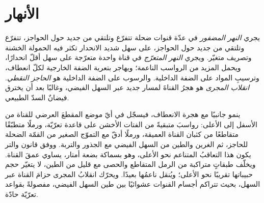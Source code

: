 \section{الأنهار}\label{sec:b3:facies-models:rivers}

\begin{definition}\label{def:b3:facies-models:rivers}
يجري \emph{النهر المضفور} في عدّة قنوات ضحلة تتفرّع وتلتقي من جديد حول الحواجز،
تتفرّع وتلتقي من جديد حول الحواجز، على سهل شديد الانحدار تكثر فيه الحمولة الخشنة
وتصريف متغيّر. ويجري \emph{النهر المتعرّج}
في قناة واحدة متعرّجة على سهل أقلّ انحدارًا، ويحمل المزيد
من الرواسب الناعمة؛ ويهاجر بتعرية الضفة الخارجية لكلّ انعطاف،
وترسيبِ المواد على الضفة الداخلية. والرسوب على الضفة الداخلية هو \emph{الحاجز
النقطي}. \emph{انقلاب المجرى} هو هجرُ
القناةَ لمسار جديد عبر السهل الفيضي، وغالبًا بعد أن يخترق فيضانٌ
السدّ الطبيعي.
\end{definition}

ينمو  جانبيًا مع هجرة الانعطاف، فيسجّل في أيّ موضع
المقطعَ العرضي للقناة من الأسفل إلى الأعلى: رواسبَ متبقيةً من الفتات الأخشن
على قاعدة تعرّيّة، ورملًا متطبّقًا متقاطعًا من كثبان القناة العميقة،
ورملًا أدقّ مع التموّج الصغير من القمّة الضحلة للحاجز، ثم
الغرين والطين من السهل الفيضي مع الجذور والتربة. ووفق قانون والتر يكون هذا
التعاقبُ المتناعم نحو الأعلى، وهو بسماكة بضعة أمتار، يساوي
عمقَ القناة. ويخلّف  طبقاتٍ متراكبة من الرمل المتقاطع
والحصى مع قليل من الطين، لا يتغيّر حجم حبيباتها تقريبًا نحو الأعلى؛ ويُنقل ناعمُها
بعيدًا. ويحرّك انقلابُ المجرى حزامَ القناة عبر السهل، بحيث
تتراكم أجسام القنوات عشوائيًا بين طين السهل الفيضي، مفصولةً بقواعد
تعرّيّة حادّة.

